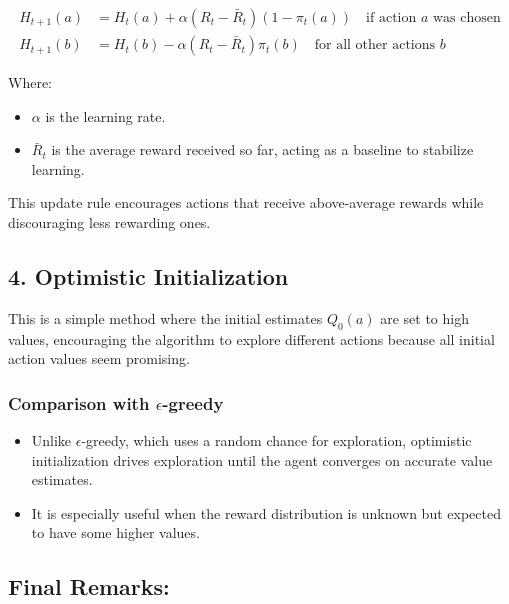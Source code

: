 \documentclass[
  letterpaper,
]{krantz}
\providecommand{\tightlist}{%
  \setlength{\itemsep}{0pt}\setlength{\parskip}{0pt}}\usepackage{longtable,booktabs,array}
\theoremstyle{plain}
\theoremstyle{definition}
\theoremstyle{definition}
\theoremstyle{remark}
\begin{document}
\[
\begin{aligned}
    H_{t+1}(a) &= 
        H_t(a) + \alpha (R_t - \bar{R}_t)(1 - \pi_t(a))
        \quad \text{if action } a \text{ was chosen} 
        \\  
    H_{t+1}(b) &=
        H_t(b) - \alpha (R_t - \bar{R}_t)\pi_t(b) 
        \quad \text{for all other actions } b 
\end{aligned}
\]

Where:

\begin{itemize}
\tightlist
\item
  \(\alpha\) is the learning rate.
\item
  \(\bar{R}_t\) is the average reward received so far, acting as a
  baseline to stabilize learning.
\end{itemize}

This update rule encourages actions that receive above-average rewards
while discouraging less rewarding ones.

\subsection{4. Optimistic
Initialization}\label{optimistic-initialization}

This is a simple method where the initial estimates \(Q_0(a)\) are set
to high values, encouraging the algorithm to explore different actions
because all initial action values seem promising.

\subsubsection{\texorpdfstring{Comparison with
\(\epsilon\)-greedy}{Comparison with \textbackslash epsilon-greedy}}\label{comparison-with-epsilon-greedy}

\begin{itemize}
\tightlist
\item
  Unlike \(\epsilon\)-greedy, which uses a random chance for
  exploration, optimistic initialization drives exploration until the
  agent converges on accurate value estimates.
\item
  It is especially useful when the reward distribution is unknown but
  expected to have some higher values.
\end{itemize}

\subsection{Final Remarks:}\label{final-remarks}
\end{document}
